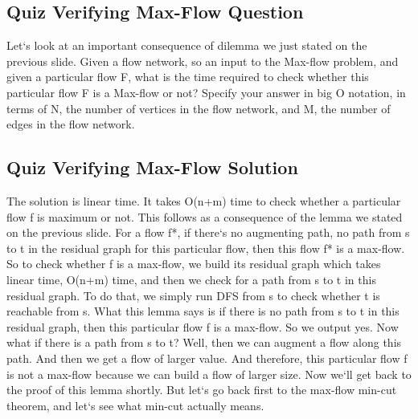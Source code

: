 \subsection{Quiz  Verifying Max-Flow Question}
Let`s look at an important consequence of dilemma we just stated on the previous slide.
Given a flow network, so an input to the Max-flow problem, and given a particular flow F, what is the time required to check whether this particular flow F is a Max-flow or not? Specify your answer in big O notation, in terms of N, the number of vertices in the flow network, and M, the number of edges in the flow network.

\subsection{Quiz  Verifying Max-Flow Solution}
The solution is linear time.
It takes O(n+m) time to check whether a particular flow f is maximum or not.
This follows as a consequence of the lemma we stated on the previous slide.
For a flow f*, if there`s no augmenting path, no path from s to t in the residual graph for this particular flow, then this flow f* is a max-flow.
So to check whether f is a max-flow, we build its residual graph which takes linear time, O(n+m) time, and then we check for a path from s to t in this residual graph.
To do that, we simply run DFS from s to check whether t is reachable from s.
What this lemma says is if there is no path from s to t in this residual graph, then this particular flow f is a max-flow.
So we output yes.
Now what if there is a path from s to t? Well, then we can augment a flow along this path.
And then we get a flow of larger value.
And therefore, this particular flow f is not a max-flow because we can build a flow of larger size.
Now we`ll get back to the proof of this lemma shortly.
But let`s go back first to the max-flow min-cut theorem, and let`s see what min-cut actually means.

